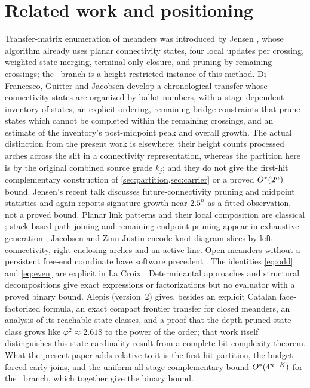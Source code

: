 \section{Related work and positioning}
\label{sec:related}

Transfer-matrix enumeration of meanders was introduced by Jensen
\cite{Jensen2000}, whose algorithm already uses planar connectivity states,
four local updates per crossing, weighted state merging, terminal-only
closure, and pruning by remaining crossings; the \LOW\ branch is a
height-restricted instance of this method. Di Francesco, Guitter and Jacobsen
\cite{DFGJ2000} develop a chronological transfer whose connectivity states
are organized by ballot numbers, with a stage-dependent inventory of states,
an explicit ordering, remaining-bridge constraints that prune states which
cannot be completed within the remaining crossings, and an estimate of the
inventory's post-midpoint peak and overall growth. The actual distinction
from the present work is elsewhere: their height counts processed arches
across the slit in a connectivity representation, whereas the partition here
is by the original combined source grade $k_j$; and they do not give the
first-hit complementary construction of \cref{sec:partition,sec:carrier} or
a proved $O^{*}(2^{n})$ bound. Jensen's recent talk \cite{Jensen2025} discusses future-connectivity
pruning and midpoint statistics and again reports signature growth near
$2.5^{n}$ as a fitted observation, not a proved bound. Planar link patterns and their local composition are classical
\cite{DFGG1997TL}; stack-based path joining and remaining-endpoint pruning
appear in exhaustive generation \cite{BobierSawada2010,SawadaLi2012}; Jacobsen
and Zinn-Justin \cite{JacobsenZinnJustin2002} encode knot-diagram slices by
left connectivity, right enclosing arches and an active line. Open meanders
without a persistent free-end coordinate have software precedent
\cite{Howroyd2015}. The identities \eqref{eq:odd} and \eqref{eq:even} are
explicit in La Croix \cite{LaCroix2003}. Determinantal approaches \cite{DiFrancesco1998} and structural
decompositions \cite{Belousov2026,CoriHetyei2024} give exact expressions or
factorizations but no evaluator with a proved binary bound. Alepis
\cite{Alepis2026} (version~2) gives, besides an explicit Catalan
face-factorized formula, an exact compact frontier transfer for closed
meanders, an analysis of its reachable state classes, and a proof that the
depth-pruned state class grows like $\varphi^{2}\approx2.618$ to the power
of the order; that work itself distinguishes this state-cardinality result
from a complete bit-complexity theorem. What the present paper adds relative
to it is the first-hit partition, the budget-forced early joins, and the
uniform all-stage complementary bound $O^{*}(4^{n-K})$ for the \HIGH\
branch, which together give the binary bound.

